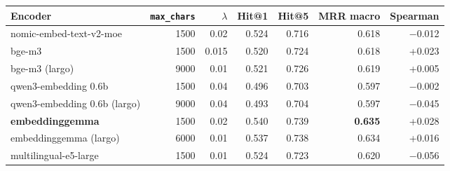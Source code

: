 \begin{tabular}{lrrrrrr}
\toprule
Encoder & \texttt{max\_chars} & $\lambda$ & Hit@1 & Hit@5 & MRR macro & Spearman \\
\midrule
nomic-embed-text-v2-moe & 1500 & 0.02 & 0.524 & 0.716 & 0.618 & $-$0.012 \\
bge-m3 & 1500 & 0.015 & 0.520 & 0.724 & 0.618 & +0.023 \\
bge-m3 (largo) & 9000 & 0.01 & 0.521 & 0.726 & 0.619 & +0.005 \\
qwen3-embedding 0.6b & 1500 & 0.04 & 0.496 & 0.703 & 0.597 & $-$0.002 \\
qwen3-embedding 0.6b (largo) & 9000 & 0.04 & 0.493 & 0.704 & 0.597 & $-$0.045 \\
\textbf{embeddinggemma} & 1500 & 0.02 & 0.540 & 0.739 & \textbf{0.635} & +0.028 \\
embeddinggemma (largo) & 6000 & 0.01 & 0.537 & 0.738 & 0.634 & +0.016 \\
multilingual-e5-large & 1500 & 0.01 & 0.524 & 0.723 & 0.620 & $-$0.056 \\
\bottomrule
\end{tabular}
